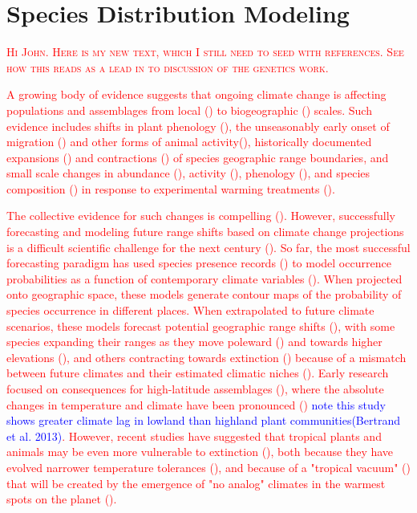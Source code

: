 \documentclass{article}
\newcommand{\Jtxt}[1]{\textcolor{blue}{#1}}
\newcommand{\Ntxt}[1]{\textcolor{red}{#1}}
\newcommand{\Ncom}[1]{\textsc {\textcolor{red}{#1}}}
\begin{document}
\section*{Species Distribution Modeling}
\Ncom{Hi John. Here is my new text, which I still need to seed with references. See how this reads as a lead in to discussion of the genetics work.}

\Ntxt{A growing body of evidence suggests that ongoing climate change is affecting populations and assemblages from local () to biogeographic () scales. Such evidence includes shifts in plant phenology (), the unseasonably early onset of migration () and other forms of animal activity(), historically documented expansions () and contractions () of species geographic range boundaries, and small scale changes in abundance (), activity (), phenology (), and species composition () in response to experimental warming treatments ().}

\Ntxt{The collective evidence for such changes is compelling (). However, successfully forecasting and modeling future range shifts based on  climate change projections is a difficult scientific challenge for the next century (). So far, the most successful forecasting paradigm has used species presence records () to model occurrence probabilities as a function of contemporary climate variables (). When projected onto geographic space, these models generate contour maps of the probability of species occurrence in different places. When extrapolated to future climate scenarios, these models forecast potential geographic range shifts (), with some species expanding their ranges as they move poleward () and towards higher elevations (), and others contracting towards extinction () because of a mismatch between future climates and their estimated climatic niches (). Early research focused on consequences for high-latitude assemblages (), where the absolute changes in temperature and climate have been pronounced () \Jtxt{note this study shows greater climate lag in lowland than highland plant communities(Bertrand et al. 2013)}. However, recent studies have suggested  that tropical plants and animals may be even more vulnerable to extinction (),  both because they have evolved narrower temperature tolerances (), and because of a "tropical vacuum" () that will be created by the emergence of "no analog" climates in the warmest spots on the planet ().}
\end{document}
